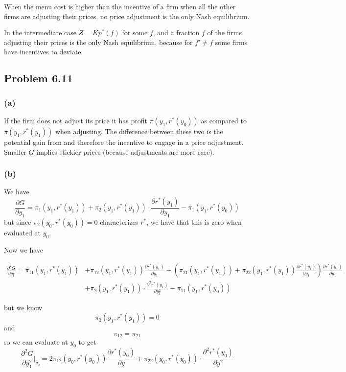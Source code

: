 \documentclass[12pt]{article}
\begin{document}
        When the menu cost is higher than the incentive of a firm when all the other firms are adjusting their prices, no price adjustment is the only Nash equilibrium. 
        
        In the intermediate case $Z = K p^{*} (f)$ for some $f$, and a fraction $f$ of the firms adjusting their prices is the only Nash equilibrium, because for $f' \neq f$ some firms have incentives to deviate. 
    
    \subsection{Problem 6.11}
    
    \subsubsection*{(a)}
    If the firm does not adjust its price it has profit $\pi \left( y_1, r^{*}(y_0)  \right)$ as compared to $\pi \left( y_1, r^{*}(y_1)  \right)$ when adjusting. 
    The difference between these two is the potential gain from and therefore the incentive to engage in a price adjustment.
    Smaller $G$ implies stickier prices (because adjustments are more rare). 
    
    \subsubsection*{(b)}
    
    We have
    \[
    \frac{\partial G}{\partial y_1} = \pi_1(y_1, r^*(y_1)) + \pi_2(y_1, r^*(y_1)) \cdot \frac{\partial r^*(y_1)}{\partial y_1} - \pi_1(y_1, r^*(y_0))
    \]
    but since $\pi_2(y_0, r^*(y_0)) = 0$ characterizes $r^*$, we have that this is zero when evaluated at $y_0$.
    
    Now we have
    \begin{tiny}
    \begin{align*}
    \frac{\partial^2 G}{\partial y_1^2} = \pi_{11}(y_1, r^*(y_1))  &+ \pi_{12}(y_1, r^*(y_1)) \frac{\partial r^*(y_1)}{\partial y_1} + \left(\pi_{21}(y_1, r^*(y_1)) + \pi_{22}(y_1, r^*(y_1)) \frac{\partial r^*(y_1)}{\partial y_1} \right) \frac{\partial r^*(y_1)}{\partial y_1} \\&+ \pi_2(y_1, r^*(y_1)) \cdot \frac{\partial^2 r^*(y_1)}{\partial y_1^2} - \pi_11(y_1, r^*(y_0))
    \end{align*}
    \end{tiny}
    but we know
    \[
    \pi_2(y_1, r^*(y_1)) = 0
    \]
    and 
    \[
    \pi_{12} = \pi_{21}
    \]
    so we can evaluate at $y_0$ to get
    \[
    \frac{\partial^2 G}{\partial y_1^2} \vert_{y_0} = 2 \pi_{12}(y_0, r^*(y_0)) \frac{\partial r^*(y_0)}{\partial y} + \pi_{22}(y_0, r^*(y_0)) \cdot \frac{\partial^2 r^*(y_0)}{\partial y^2}
    \]
    
\end{document}
